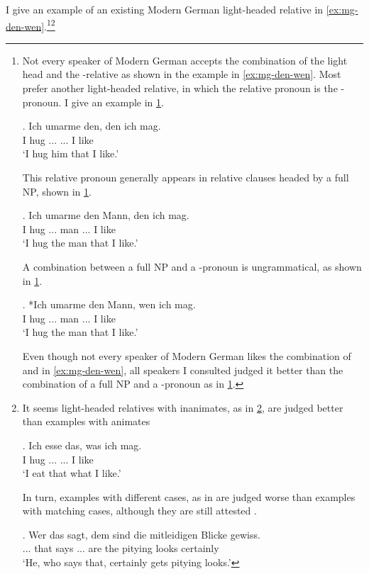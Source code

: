 I give an example of an existing Modern German light-headed relative in \ref{ex:mg-den-wen}.\footnote{
Not every speaker of Modern German accepts the combination of the light head  and the -relative  as shown in the example in \ref{ex:mg-den-wen}.
Most prefer another light-headed relative, in which the relative pronoun is the -pronoun. I give an example in \ref{ex:mg-den-den}.

\exg. Ich umarme den, den ich mag.\\
I hug ... ... I like\\
`I hug him that I like.'\label{ex:mg-den-den}

This relative pronoun generally appears in relative clauses headed by a full NP, shown in \ref{ex:mg-den-headed}.

\exg. Ich umarme den Mann, den ich mag.\\
I hug ... man ... I like\\
`I hug the man that I like.'\label{ex:mg-den-headed}

A combination between a full NP and a -pronoun is ungrammatical, as shown in \ref{ex:mg-wen-headed}.

\exg. *Ich umarme den Mann, wen ich mag.\\
I hug ... man ... I like\\
`I hug the man that I like.'\label{ex:mg-wen-headed}

Even though not every speaker of Modern German likes the combination of  and  in \ref{ex:mg-den-wen}, all speakers I consulted judged it better than the combination of a full NP and a -pronoun as in \ref{ex:mg-wen-headed}.
}\footnote{
It seems light-headed relatives with inanimates, as in \ref{ex:mg-das-was}, are judged better than examples with animates \citep[cf.][ftn. 29]{hanink2018}

\exg. Ich esse das, was ich mag.\\
I hug ... ... I like\\
`I eat that what I like.'\label{ex:mg-das-was}

In turn, examples with different cases, as in are judged worse than examples with matching cases, although they are still attested \citep[ftn. 6]{fuss2014}.

\exg. Wer das sagt, dem sind die mitleidigen Blicke gewiss.\\
... that says ... are the pitying looks certainly\\
`He, who says that, certainly gets pitying looks.'\label{ex:mg-wer-dem}

\phantom{x}
}

